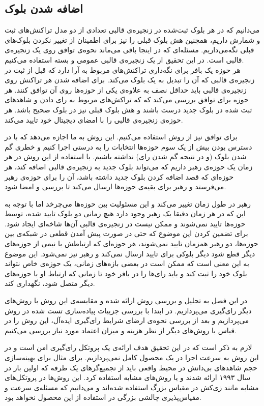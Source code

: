 \subsection{اضافه شدن بلوک}
می‌دانیم که در هر بلوک ثبت‌شده در زنجیره‌ی قالبی تعدادی از دو مدل تراکنش‌های ثبت و شمارش داریم، همچنین هش بلوک قبلی را نیز برای اطمینان از تغییر نکردن بلوک‌های قبلی نگه‌می‌داریم. مسئله‌ای که در اینجا باقی می‌ماند نحوه‌ی توافق روی یک زنجیره‌ی قالبی است. در این تحقیق از یک زنجیره‌ی قالبی عمومی و بسته استفاده می‌کنیم.
\\
هر حوزه یک بافر برای نگه‌داری تراکنش‌های مربوط به آرا دارد که قبل از ثبت در زنجیره‌ی قالبی که آن را تبدیل به یک بلوک می‌کند. برای اضافه شدن هر تراکنش روی زنجیره‌ی قالبی باید حداقل نصف به علاوه‌ی یکی از حوزه‌ها روی آن توافق کنند. هر حوزه برای توافق بررسی می‌کند که که تراکش‌های مربوط به رای دادن و شاهد‌های ثبت شده در بلوک جدید درست باشند و هش بلوک قبلی نیز در بلوک صحیح باشد. هر حوزه‌ی زنجیره‌ی قالبی را با امضای دیجیتال خود تایید می‌کند. 
\par 
برای توافق نیز از روش  استفاده می‌کنیم. این روش به ما اجازه می‌دهد که با در دسترس بودن بیش از یک سوم حوزه‌ها انتخابات را به درستی اجرا کنیم و خطری گم شدن بلوک (و در نتیجه گم شدن رای) نداشته باشیم. با استفاده از این روش در هر زمان یک حوزه‌ی رهبر داریم که می‌تواند بلوک جدید به زنجیره‌ی قالبی اضافه کند، هر حوزه‌ای که قصد اضافه کردن بلوک جدید داشته باشد، آن را برای حوزه‌ی رهبر می‌فرستد و رهبر برای بقیه‌ی حوزه‌ها ارسال می‌کند تا بررسی و امضا شود. 
\par 
رهبر در طول زمان تغییر می‌کند و این مسئولیت بین حوزه‌ها می‌چرخد اما با توجه  به این که در هر زمان دقیقا یک رهبر وجود دارد هیچ زمانی دو بلوک تایید شده، توسط حوزه‌ها تایید نمی‌شوند و ممکن نیست در زنجیره‌ی قالبی آن‌ها شاخه‌ای ایجاد شود. برای تضمین کردن این موضوع که حتی در صورت پیش آمدن قطعی در شبکه‌ی بین حوزه‌ها، دو رهبر همزمان تایید نمی‌شوند، هر حوزه‌ای که ارتباطش با نیمی از حوزه‌های دیگر قطع شود دیگر بلوکی برای تایید ارسال نمی‌کند و رهبر نیز نمی‌شود. این موضوع به این معنی است که ممکن است در بعضی بازه‌های زمانی، یک حوزه‌ی خاص نتواند بلوک خود را ثبت کند و باید رای‌ها را در بافر خود تا زمانی که ارتباط او با حوزه‌های دیگر متصل شود، نگهداری کند.

در این فصل به تحلیل و بررسی روش ارائه شده و مقایسه‌ی این روش با روش‌های دیگر رای‌گیری می‌پردازیم. در ابتدا با بررسی جزییات پیاده‌سازی تست شده در روش می‌پردازیم و بعد از بررسی نحوه‌ی ارضای شرایط رای‌گیری ایده‌آل، این روش را در قیاس با روش‌های دیگر از نظر هزینه و میزان اعتماد مورد نیاز بررسی می‌کنیم. 
\par
لازم به ذکر است که در این تحقیق هدف ارائه‌ی یک پروتکل رای‌گیری امن است و در این روش به سرعت اجرا در یک محصول کامل نمی‌پردازیم. برای مثال برای بهینه‌سازی حجم شاهد‌های بی‌دانش در محیط واقعی باید از تجمیع‌گر‌های یک طرفه 
که اولین بار در سال ۱۹۹۳ 
\cite{oneway}
ارائه شدند و یا روش‌های مشابه استفاده کرد. این روش‌ها در پروتکل‌های مشابه مانند زی‌کش در مقیاس بزرگ استفاده‌ شده‌اند و می‌دانیم که مسئله‌ی سرعت و مقیاس‌پذیری چالشی بزرگی در استفاده از این محصول نخواهد بود.

